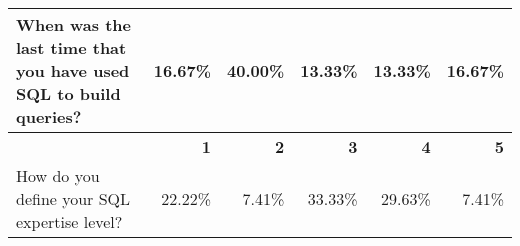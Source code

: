 \begin{table}[tb]
\begin{tabular}{@{}C{4cm}rrrrr@{}}
  When was the last time that you have used SQL to build queries? & 16.67\%                                    & 40.00\%                                            & 13.33\%                                             & 13.33\%                                        & 16.67\%                                              \\ \midrule
                                                                  & \textbf{1}                                 & \textbf{2}                                         & \textbf{3}                                          & \textbf{4}                                     & \textbf{5}                                           \\ \midrule
  How do you define your SQL expertise level?                     & 22.22\%                                    & 7.41\%                                             & 33.33\%                                             & 29.63\%                                        & 7.41\%                                               \\ \bottomrule
  \end{tabular}
  \end{table}

